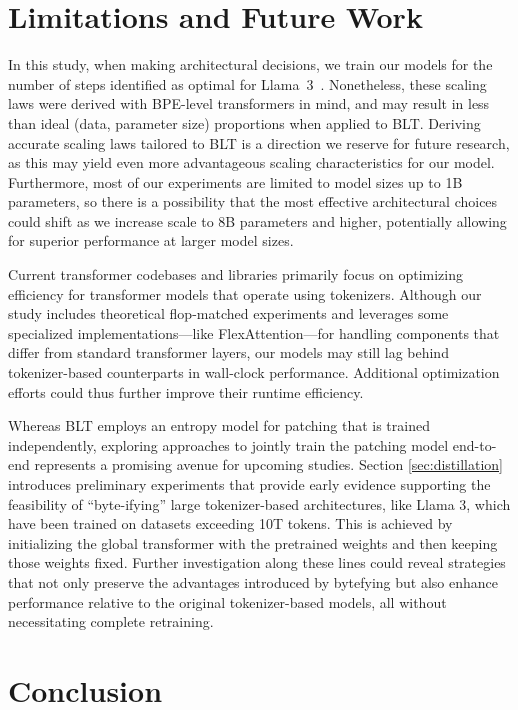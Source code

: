 \section{Limitations and Future Work}

In this study, when making architectural decisions, we train our models for the number of steps identified as optimal for Llama~3~\citep{dubey2024llama}. Nonetheless, these scaling laws were derived with BPE-level transformers in mind, and may result in less than ideal (data, parameter size) proportions when applied to {\textsc BLT}. Deriving accurate scaling laws tailored to {\textsc BLT} is a direction we reserve for future research, as this may yield even more advantageous scaling characteristics for our model. Furthermore, most of our experiments are limited to model sizes up to 1B parameters, so there is a possibility that the most effective architectural choices could shift as we increase scale to 8B parameters and higher, potentially allowing for superior performance at larger model sizes.

Current transformer codebases and libraries primarily focus on optimizing efficiency for transformer models that operate using tokenizers. Although our study includes theoretical flop-matched experiments and leverages some specialized implementations—like FlexAttention—for handling components that differ from standard transformer layers, our models may still lag behind tokenizer-based counterparts in wall-clock performance. Additional optimization efforts could thus further improve their runtime efficiency.

Whereas {\textsc BLT} employs an entropy model for patching that is trained independently, exploring approaches to jointly train the patching model end-to-end represents a promising avenue for upcoming studies. Section \ref{sec:distillation} introduces preliminary experiments that provide early evidence supporting the feasibility of ``byte-ifying'' large tokenizer-based architectures, like Llama 3, which have been trained on datasets exceeding 10T tokens. This is achieved by initializing the global transformer with the pretrained weights and then keeping those weights fixed. Further investigation along these lines could reveal strategies that not only preserve the advantages introduced by bytefying but also enhance performance relative to the original tokenizer-based models, all without necessitating complete retraining.

\section{Conclusion}
\label{section:conclusion}

